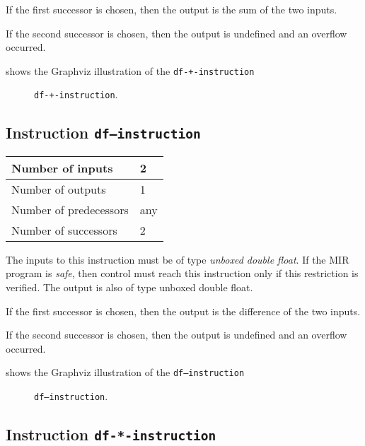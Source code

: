 If the first successor is chosen, then the output is
the sum of the two inputs.  

If the second successor is chosen, then the output is undefined and an
overflow occurred. 

 shows the Graphviz illustration of the
\texttt{df-+-instruction}

\begin{figure}
\begin{center}
\end{center}
\caption{\label{fig-df-+-instruction}
\texttt{df-+-instruction}.}
\end{figure}

\subsection{Instruction \texttt{df---instruction}}
\label{mir-instruction-df--}

\begin{tabular}{|l|l|}
\hline
Number of inputs & 2\\
\hline
Number of outputs & 1\\
\hline
Number of predecessors & any\\
\hline
Number of successors & 2\\
\hline
\end{tabular}

The inputs to this instruction must be of type \emph{unboxed double
  float}.  If the MIR program is \emph{safe}, then control must reach
this instruction only if this restriction is verified.  The output is
also of type unboxed double float.

If the first successor is chosen, then the output is
the difference of the two inputs.  

If the second successor is chosen, then the output is undefined and an
overflow occurred. 

 shows the Graphviz illustration of the
\texttt{df---instruction}

\begin{figure}
\begin{center}
\end{center}
\caption{\label{fig-df---instruction}
\texttt{df---instruction}.}
\end{figure}

\subsection{Instruction \texttt{df-*-instruction}}
\label{mir-instruction-df-*}


